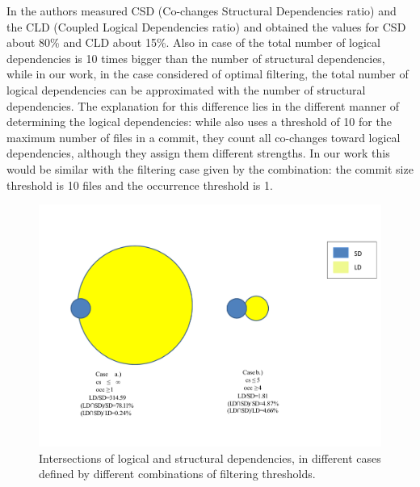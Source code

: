 \documentclass[a4paper,twoside]{article}
\begin{document}
In \cite{DBLP:journals/jss/AjienkaC17} the authors measured CSD (Co-changes Structural Dependencies ratio) and the CLD (Coupled Logical Dependencies ratio) and obtained the values for CSD about 80\% and CLD about 15\%.  Also in case of \cite{DBLP:journals/jss/AjienkaC17}  the total number of logical dependencies is 10 times bigger than the number of structural dependencies, while in our work, in the case considered of optimal filtering,  the total number of logical dependencies can be approximated with the number of structural dependencies. The explanation for this difference lies in the different manner of determining the logical dependencies: while \cite{DBLP:journals/jss/AjienkaC17} also uses a threshold of 10 for the maximum number of files in a commit, they count all co-changes toward logical dependencies, although they assign them different strengths. In our work this would be similar with the filtering case given by the combination: the commit size threshold is 10 files and the occurrence threshold is 1. 


\begin{figure}[!t]
\centering
\includegraphics[width=5.7in]{figvenn-new.pdf}
\vspace{-1cm}
\caption{Intersections of logical and structural dependencies, in different cases defined by different combinations of filtering thresholds. }
\label{fig_venn}
\end{figure}
\end{document}
